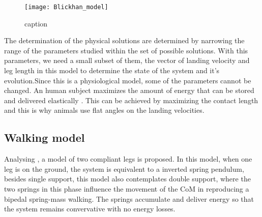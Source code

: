 \begin{figure}[H]
  \centering
  \texttt{[image: Blickhan\_model]}
  \caption{caption}
  \label{blickhan_model}
 \end{figure}

\noindent The determination of the physical solutions are determined by narrowing the range of the parameters studied within the set of possible solutions. With this parameters, we need a small subset of them, the vector of landing velocity and leg length in this model to determine the state of the system and it's evolution.Since this is a physiological model, some of the parameters cannot be changed. An human subject maximizes the amount of energy that can be stored and delivered elastically \cite{Blickhan1989}. This can be achieved by maximizing the contact length and this is why animals use flat angles on the landing velocities.

\subsection{Walking model}

Analysing \cite{Seyfarth:2008}, a model of two compliant legs is proposed. In this model, when one leg is on the ground, the system is equivalent to a inverted spring pendulum,  besides single support, this model also contemplates double support, where the two springs in this phase influence the movement of the CoM in reproducing a bipedal spring-mass walking. The springs accumulate and deliver energy so that the system remains convervative with no energy losses.

